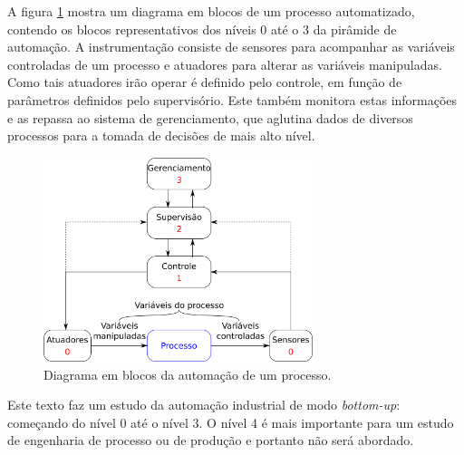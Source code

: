 A figura \ref{fig:automacao} mostra um diagrama em blocos de um processo automatizado, contendo os blocos representativos dos níveis 0 até o 3 da pirâmide de automação. A instrumentação consiste de sensores para acompanhar as variáveis controladas de um processo e atuadores para alterar as variáveis manipuladas. Como tais atuadores irão operar é definido pelo controle, em função de parâmetros definidos pelo supervisório. Este também monitora estas informações e as repassa ao sistema de gerenciamento, que aglutina dados de diversos processos para a tomada de decisões de mais alto nível.
\begin{figure}[htb]
	\begin{center}
    \includegraphics[width=0.7\textwidth]{figuras/automacao}
	\end{center}
	\caption{Diagrama em blocos da automação de um processo.}
	\label{fig:automacao}
\end{figure}

Este texto faz um estudo da automação industrial de modo \emph{bottom-up}: começando do nível 0 até o nível 3. O nível 4 é mais importante para um estudo de engenharia de processo ou de produção e portanto não será abordado.
